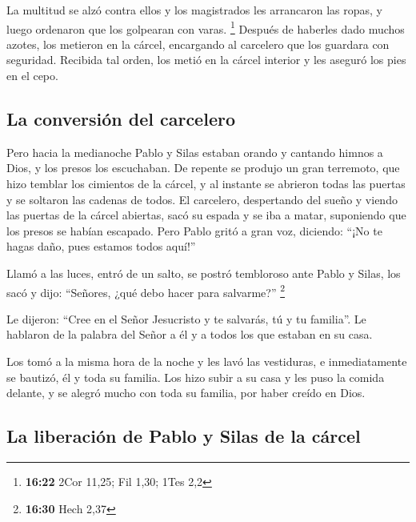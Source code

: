 \begin{paracol}{2}
 La multitud se alzó contra ellos y los magistrados les
arrancaron las ropas, y luego ordenaron que los golpearan con varas.
\footnote{\textbf{16:22} 2Cor 11,25; Fil 1,30; 1Tes 2,2} 
Después de haberles dado muchos azotes, los metieron en la cárcel,
encargando al carcelero que los guardara con seguridad. 
Recibida tal orden, los metió en la cárcel interior y les aseguró los
pies en el cepo.

\hypertarget{la-conversiuxf3n-del-carcelero}{%
\subsection{La conversión del
carcelero}\label{la-conversiuxf3n-del-carcelero}}

 Pero hacia la medianoche Pablo y Silas estaban orando y
cantando himnos a Dios, y los presos los escuchaban.  De
repente se produjo un gran terremoto, que hizo temblar los cimientos de
la cárcel, y al instante se abrieron todas las puertas y se soltaron las
cadenas de todos.  El carcelero, despertando del sueño y
viendo las puertas de la cárcel abiertas, sacó su espada y se iba a
matar, suponiendo que los presos se habían escapado. 
Pero Pablo gritó a gran voz, diciendo: ``¡No te hagas daño, pues estamos
todos aquí!''

 Llamó a las luces, entró de un salto, se postró
tembloroso ante Pablo y Silas,  los sacó y dijo:
``Señores, ¿qué debo hacer para salvarme?'' \footnote{\textbf{16:30}
  Hech 2,37}

 Le dijeron: ``Cree en el Señor Jesucristo y te salvarás,
tú y tu familia''.  Le hablaron de la palabra del Señor a
él y a todos los que estaban en su casa.

 Los tomó a la misma hora de la noche y les lavó las
vestiduras, e inmediatamente se bautizó, él y toda su familia.
 Los hizo subir a su casa y les puso la comida delante, y
se alegró mucho con toda su familia, por haber creído en Dios.

\hypertarget{la-liberaciuxf3n-de-pablo-y-silas-de-la-cuxe1rcel}{%
\subsection{La liberación de Pablo y Silas de la
cárcel}\label{la-liberaciuxf3n-de-pablo-y-silas-de-la-cuxe1rcel}}


\end{paracol}
